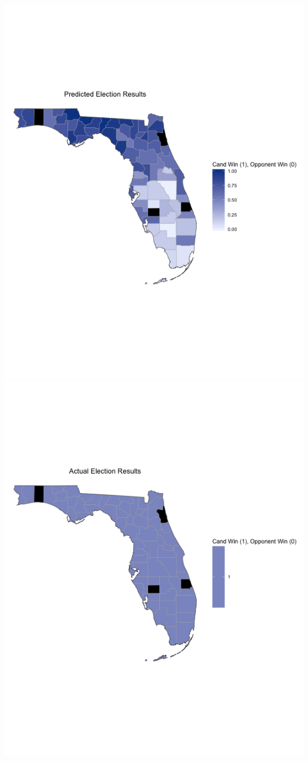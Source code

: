 \documentclass[11pt]{article}
\begin{document}
\includegraphics[scale=0.4]{../knn_plots/florida_predicted.png} \includegraphics[scale=0.4]{../knn_plots/florida_actual.png}\\
\end{document}
